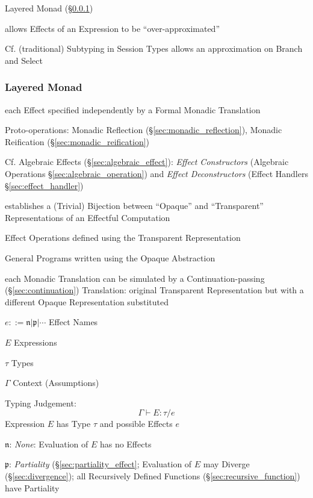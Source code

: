 Layered Monad (\S\ref{sec:layered_monad}) \cite{filinski99}

allows Effects of an Expression to be ``over-approximated''
\cite{orchard-yoshida16}

\fist Cf. (traditional) Subtyping in Session Types allows an
approximation on Branch and Select \cite{orchard-yoshida16}



\subsubsection{Layered Monad}\label{sec:layered_monad}
\cite{filinski99}

each Effect specified independently by a Formal Monadic Translation

Proto-operations: Monadic Reflection (\S\ref{sec:monadic_reflection}),
Monadic Reification (\S\ref{sec:monadic_reification})

\fist Cf. Algebraic Effects (\S\ref{sec:algebraic_effect}):
\emph{Effect Constructors} (Algebraic Operations
\S\ref{sec:algebraic_operation}) and \emph{Effect Deconstructors}
(Effect Handlers \S\ref{sec:effect_handler})


establishes a (Trivial) Bijection between ``Opaque'' and
``Transparent'' Representations of an Effectful Computation

Effect Operations defined using the Transparent Representation

General Programs written using the Opaque Abstraction

each Monadic Translation can be simulated by a Continuation-passing
(\S\ref{sec:continuation}) Translation: original Transparent
Representation but with a different Opaque Representation substituted

$e ::= \mathfrak{n} | \mathfrak{p} | \cdots$ Effect Names

$E$ Expressions

$\tau$ Types

$\Gamma$ Context (Assumptions)

Typing Judgement:
\[
  \Gamma \vdash E : \tau / e
\]
Expression $E$ has Type $\tau$ and possible Effects $e$

$\mathfrak{n}$: \emph{None}: Evaluation of $E$ has no Effects

$\mathfrak{p}$: \emph{Partiality} (\S\ref{sec:partiality_effect};
Evaluation of $E$ may Diverge (\S\ref{sec:divergence}); all
Recursively Defined Functions (\S\ref{sec:recursive_function}) have
Partiality

